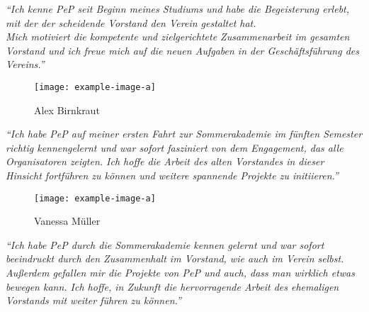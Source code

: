 \documentclass{pepnewsletter}
\begin{document}
\textit{\enquote{Ich kenne PeP seit Beginn meines Studiums und habe die Begeisterung erlebt, mit der der scheidende Vorstand den Verein gestaltet hat.\\
Mich motiviert die kompetente und zielgerichtete Zusammenarbeit im gesamten Vorstand und ich freue mich auf die neuen Aufgaben in der Geschäftsführung des Vereins.}}

\begin{wrapfigure}{l}{.21\textwidth}
	\vspace{-20pt}
	\begin{center}
		\texttt{[image: example-image-a]}
	\end{center}
	\vspace{-20pt}
	\caption*{Alex Birnkraut}
	\vspace{-10pt}
\end{wrapfigure}

\textit{\enquote{Ich habe PeP auf meiner ersten Fahrt zur Sommerakademie im fünften Semester richtig kennengelernt und war sofort fasziniert von dem Engagement, das alle Organisatoren zeigten. Ich hoffe die Arbeit des alten Vorstandes in dieser Hinsicht fortführen zu können und weitere spannende Projekte zu initiieren.}}

\begin{wrapfigure}{r}{.21\textwidth}
	\vspace{-20pt}
	\begin{center}
		\texttt{[image: example-image-a]}
	\end{center}
	\vspace{-20pt}
	\caption*{Vanessa Müller}
	\vspace{-10pt}
\end{wrapfigure}

\textit{\enquote{Ich habe PeP durch die Sommerakademie kennen gelernt und war sofort beeindruckt durch den Zusammenhalt im Vorstand, wie auch im Verein selbst. Außerdem gefallen mir die Projekte von PeP und auch, dass man wirklich etwas bewegen kann. Ich hoffe, in Zukunft die hervorragende Arbeit des ehemaligen Vorstands mit weiter führen zu können.}}
\end{document}
